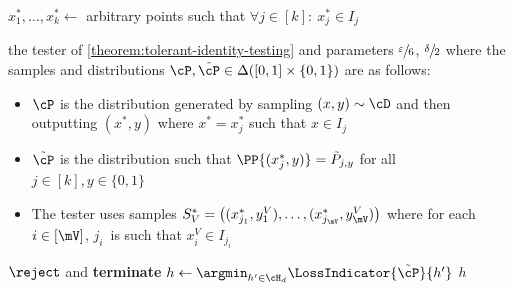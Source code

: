 \documentclass[11pt]{article}
\begin{document}
\begin{minipage}{\textwidth}
\begin{protocol}[H]
\begin{ShadedAlgorithmBox}
\begin{algorithmic}
			\vsp

			\State $x_1^*,\dots,x_k^* \gets$ arbitrary points such that $\forall j \in [k]: ~ x_j^* \in I_j$

			\vsp

			 the tester of \cref{theorem:tolerant-identity-testing} and parameters $\sfrac{\varepsilon}{6}$, $\sfrac{\delta}{2}$ where the samples and distributions $\cP,\tilde{\cP} \in \Delta([0,1] \times \{0,1\})$ are as follows:
			\vsp
			\begin{itemize}
				\item[-]{
					$\cP$ is the distribution generated by sampling $(x,y) \sim \cD$ and then outputting $(x^*,y)$ where $x^* = x_j^*$ such that $x \in I_j$
				}
				\item[-]{
					$\tilde{\cP}$ is the distribution such that $\PP{(x_j^*,y)} = \tilde{P}_{j,y}$ for all $j \in [k],y \in \{0,1\}$
				}
				\item[-]{
					The tester uses samples $S_V^* = 
					\left(
						(x_{j_1}^*,y_1^V),
						\dots,
						(x_{j_{\mV}}^*,y_{\mV}^V)
					\right)$ 
					where for each $i \in [\mV]$, $j_i$~is such that $x_{i}^V \in I_{j_i}$
				}
			\end{itemize}
			\vspp
				 $\reject$ and {\bfseries terminate} 
			\EndIf
			\vsp
			\State $h \gets \argmin_{h' \in \cH_d} \LossIndicator{\tilde{\cP}}{h'}$
			\vsp
			 $h$  
			
		\end{algorithmic}	
	\end{ShadedAlgorithmBox}
	\caption{Verification protocol for unions of $d$-intervals.}
	\label{protocol:union-of-intervals}
\end{protocol}
\end{minipage}
	
\end{document}
